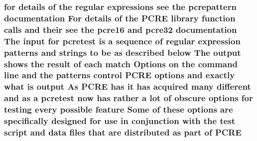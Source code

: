 \subsubsection[{\texorpdfstring{P\+C\+RE}{PCRE}}]{\setlength{\rightskip}{0pt plus 5cm}for {\bf details} {\bf of} the regular {\bf expressions} see the {\bf pcrepattern} {\bf documentation} For {\bf details} {\bf of} the P\+C\+RE {\bf library} {\bf function} {\bf calls} and their see the {\bf pcre16} and {\bf pcre32} {\bf documentation} The {\bf input} for {\bf pcretest} {\bf is} {\bf a} {\bf sequence} {\bf of} regular {\bf expression} {\bf patterns} and {\bf strings} {\bf to} {\bf be} {\bf as} described {\bf below} The {\bf output} shows the {\bf result} {\bf of} each {\bf match} Options {\bf on} the {\bf command} {\bf line} and the {\bf patterns} control P\+C\+RE {\bf options} and {\bf exactly} {\bf what} {\bf is} {\bf output} As P\+C\+RE has {\bf it} has acquired many different and {\bf as} {\bf a} {\bf pcretest} {\bf now} has rather {\bf a} lot {\bf of} obscure {\bf options} for testing every {\bf possible} {\bf feature} Some {\bf of} these {\bf options} {\bf are} specifically designed for use {\bf in} conjunction {\bf with} the test {\bf script} and {\bf data} {\bf files} that {\bf are} {\bf distributed} {\bf as} part {\bf of} P\+C\+RE}\hypertarget{pcretest_8txt_a88269140b899ac3861deaa447ade5d30}{}\label{pcretest_8txt_a88269140b899ac3861deaa447ade5d30}
